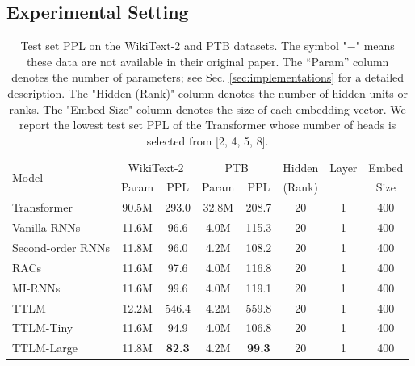 \subsection{Experimental Setting}
\label{sec:setting}
\begin{table}[t]
\small
\centering
  \begin{tabular}{l|cc|cc|ccc}
    \toprule
      \multirow{2}{*}{Model} & \multicolumn{2}{c|}{
      WikiText-2} &
    \multicolumn{2}{c|}{PTB} & Hidden & Layer & Embed  \\
    
    &Param & PPL  & Param  & PPL & (Rank) & & Size\\
    
    \midrule
    Transformer \citep{vaswani2017attention} & 90.5M & 293.0 & 32.8M & 208.7 &20 & 1 & 400 \\
    Vanilla-RNNs \citep{mikolov2012context} & 11.6M & 96.6 & 4.0M & 115.3 & 20 & 1 & 400\\
    Second-order RNNs \citep{hochreiter1997long} & 11.8M & 96.0 & 4.2M& 108.2 & 20 & 1 & 400\\
    RACs  \citep{levine2018benefits} &11.6M& 97.6 & 4.0M  & 116.8 &20 & 1 & 400 \\
    MI-RNNs \citep{wu_multiplicative_2016} &  11.6M & 99.6 &4.0M & 119.1 & 20 & 1 & 400 \\
    \hline
    TTLM & 12.2M & 546.4 & 4.2M & 559.8 & 20& 1 & 400\\
    TTLM-Tiny & 11.6M &94.9 & 4.0M &106.8 & 20 & 1 & 400\\
    TTLM-Large &11.8M &\textbf{82.3} & 4.2M & \textbf{99.3} & 20 & 1 & 400 \\
  \bottomrule
\end{tabular}
\caption{Test set PPL on the WikiText-2 and PTB datasets. The symbol "$-$" means these data are not available in their original paper. The “Param” column denotes the number of parameters; see Sec. \ref{sec:implementations} for a detailed description.  The "Hidden (Rank)" column  denotes the number of hidden units or ranks. The "Embed Size" column denotes the size of each embedding vector.  We report the lowest test set PPL of the Transformer whose number of heads is  selected from [2, 4, 5, 8]. \label{tab:evaluation}}
\end{table}
%
